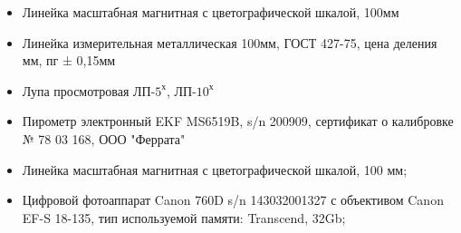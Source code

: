 \begin{itemize}
	\item   Линейка масштабная магнитная с цветографической шкалой, 100мм
	\item   Линейка измерительная металлическая 100мм, ГОСТ 427-75, цена деления мм, пг ± 0,15мм
	\item  Лупа просмотровая ЛП-$ 5^х $, ЛП-$ 10^х $ 
\item  Пирометр электронный EKF  MS6519B, s/n 200909, сертификат о калибровке № 78 03 168, ООО "Феррата"
	\item  Линейка масштабная магнитная с цветографической шкалой, 100 мм;
	\item 	
Цифровой фотоаппарат Canon 760D s/n 143032001327 с объективом Canon EF-S 18-135, тип используемой памяти: Transcend,  32Gb;

\end{itemize}
